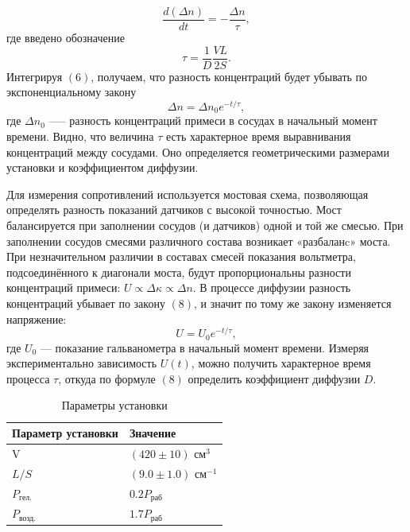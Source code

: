 \documentclass[12pt,a4paper]{article}
\begin{document}
\begin{equation}
	\dfrac{d(\Delta n)}{dt} = - \dfrac{\Delta n}{\tau},
\end{equation}
где введено обозначение
\begin{equation}
	\tau = \dfrac{1}{D} \dfrac{VL}{2S}.
\end{equation}
Интегрируя $(6)$, получаем, что разность концентраций будет убывать по экспоненциальному закону
\begin{equation}
	\Delta n = \Delta n_0 e^{-t/\tau},
\end{equation}
где $\Delta n_0$ --— разность концентраций примеси в сосудах в начальный момент времени. Видно, что величина $\tau$ есть характерное время выравнивания концентраций между сосудами. Оно определяется геометрическими размерами установки и коэффициентом диффузии.

Для измерения сопротивлений используется мостовая схема, позволяющая определять разность показаний датчиков с высокой точностью. Мост балансируется при заполнении сосудов (и датчиков) одной и той же смесью. При заполнении сосудов смесями различного состава возникает «разбаланc» моста. При незначительном различии в составах смесей показания вольтметра, подсоединённого к диагонали моста, будут пропорциональны разности концентраций примеси: $U \propto \Delta \kappa \propto \Delta n$. В процессе диффузии разность концентраций убывает по закону $(8)$, и значит по тому же закону изменяется напряжение: 
\begin{equation}
	U = U_0 e^{-t/\tau},
\end{equation}
где $U_0$ --- показание гальванометра в начальный момент времени. Измеряя экспериментально зависимость $U(t)$, можно получить характерное время процесса $\tau$, откуда по формуле $(8)$ определить коэффициент диффузии $D$.


\begin{table}[h]
\centering
\caption{Параметры установки}
\label{tab:scheme}
\footnotesize
\begin{tabular}{ll}
	
	\toprule
	Параметр установки & Значение \\
	\midrule
	V & $(420\pm10) $ $\text{см}^3$ \\
	$L/S$ & $(9.0\pm1.0)$ $ \text{см}^{-1}$ \\
	$P_{\text{гел.}}$ & $0.2 P_{\text{раб}}$ \\
	$P_{\text{возд.}}$ & $1.7 P_{\text{раб}}$ \\
	\bottomrule
	
\end{tabular}

\end{table} 
\end{document}
